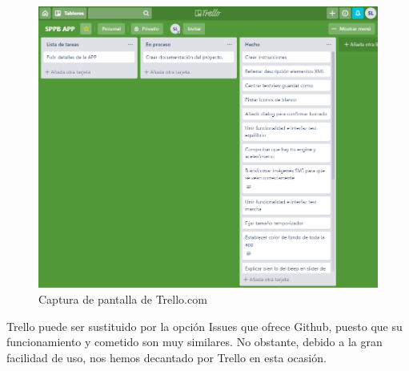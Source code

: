 \begin{figure}[H]
	\centering
	\includegraphics[scale=0.42]{imagenes/trello.png}
	\caption{Captura de pantalla de Trello.com\label{fig:trello}}
\end{figure}

Trello puede ser sustituido por la opción Issues que ofrece Github, puesto que su funcionamiento y cometido son muy similares. No obstante, debido a la gran facilidad de uso, nos hemos decantado por Trello en esta ocasión.